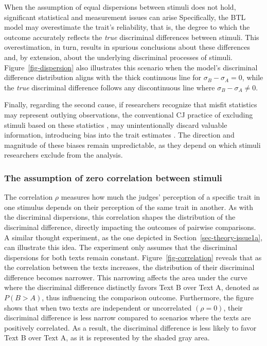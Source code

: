 \documentclass[
  authoryear,
  review,
  1p]{elsarticle}
\begin{document}
When the assumption of equal dispersions between stimuli does not hold,
significant statistical and measurement issues can arise Specifically,
the BTL model may overestimate the trait's reliability, that is, the
degree to which the outcome accurately reflects the \emph{true}
discriminal differences between stimuli. This overestimation, in turn,
results in spurious conclusions about these differences
\citep[pp.~370]{McElreath_2020} and, by extension, about the underlying
discriminal processes of stimuli. Figure~\ref{fig-dispersion} also
illustrates this scenario when the model's discriminal difference
distribution aligns with the thick continuous line for
\(\sigma_{B}-\sigma_{A}=0\), while the \emph{true} discriminal
difference follows any discontinuous line where
\(\sigma_{B}-\sigma_{A} \neq 0\).

Finally, regarding the second cause, if researchers recognize that
misfit statistics may represent outlying observations, the conventional
CJ practice of excluding stimuli based on these statistics
\citep{Pollitt_2012a, Pollitt_2012b, vanDaal_et_al_2016, Goossens_et_al_2018},
may unintentionally discard valuable information, introducing bias into
the trait estimates \citep[chap.~12]{Zimmerman_1994, McElreath_2020}.
The direction and magnitude of these biases remain unpredictable, as
they depend on which stimuli researchers exclude from the analysis.

\subsubsection{The assumption of zero correlation between
stimuli}\label{sec-theory-issue1b}

The correlation \(\rho\) measures how much the judges' perception of a
specific trait in one stimulus depends on their perception of the same
trait in another. As with the discriminal dispersions, this correlation
shapes the distribution of the discriminal difference, directly
impacting the outcomes of pairwise comparisons. A similar thought
experiment, as the one depicted in Section~\ref{sec-theory-issue1a}, can
illustrate this idea. The experiment only assumes that the discriminal
dispersions for both texts remain constant. Figure~\ref{fig-correlation}
reveals that as the correlation between the texts increases, the
distribution of their discriminal difference becomes narrower. This
narrowing affects the area under the curve where the discriminal
difference distinctly favors Text B over Text A, denoted as
\(P(B > A)\), thus influencing the comparison outcome. Furthermore, the
figure shows that when two texts are independent or uncorrelated
\((\rho=0)\), their discriminal difference is less narrow compared to
scenarios where the texts are positively correlated. As a result, the
discriminal difference is less likely to favor Text B over Text A, as it
is represented by the shaded gray area.
\end{document}
